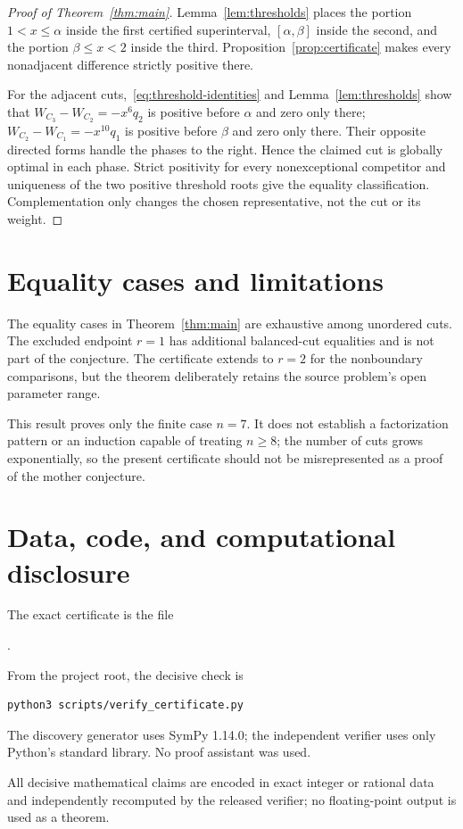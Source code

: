 \documentclass[11pt]{amsart}
\theoremstyle{definition}
\begin{document}
\begin{proof}[Proof of Theorem~\ref{thm:main}]
Lemma~\ref{lem:thresholds} places the portion $1<x\leq\alpha$ inside the
first certified superinterval, $[\alpha,\beta]$ inside the second, and the
portion $\beta\leq x<2$ inside the third.
Proposition~\ref{prop:certificate} makes every nonadjacent
difference strictly positive there.

For the adjacent cuts,~\eqref{eq:threshold-identities} and
Lemma~\ref{lem:thresholds} show that
$W_{C_3}-W_{C_2}=-x^6q_2$ is positive before $\alpha$ and zero only there;
$W_{C_2}-W_{C_1}=-x^{10}q_1$ is positive before $\beta$ and zero only there.
Their opposite directed forms handle the phases to the right.  Hence the
claimed cut is globally optimal in each phase.  Strict positivity for every
nonexceptional competitor and uniqueness of the two positive threshold roots
give the equality classification.  Complementation only changes the chosen
representative, not the cut or its weight.
\end{proof}

\section{Equality cases and limitations}

The equality cases in Theorem~\ref{thm:main} are exhaustive among unordered
cuts.  The excluded endpoint $r=1$ has additional balanced-cut equalities and
is not part of the conjecture.  The certificate extends to $r=2$ for the
nonboundary comparisons, but the theorem deliberately retains the source
problem's open parameter range.

This result proves only the finite case $n=7$.  It does not establish a
factorization pattern or an induction capable of treating $n\geq8$; the
number of cuts grows exponentially, so the present certificate should not be
misrepresented as a proof of the mother conjecture.

\section*{Data, code, and computational disclosure}

The exact certificate is the file
\begin{center}
{\small{}.}
\end{center}
From the project root,
the decisive check is
\begin{verbatim}
python3 scripts/verify_certificate.py
\end{verbatim}
The discovery generator uses SymPy 1.14.0; the independent verifier uses only
Python's standard library.  No proof assistant was used.

All decisive mathematical claims are encoded in exact integer or rational data
and independently recomputed by the released verifier; no floating-point
output is used as a theorem.



\end{document}
